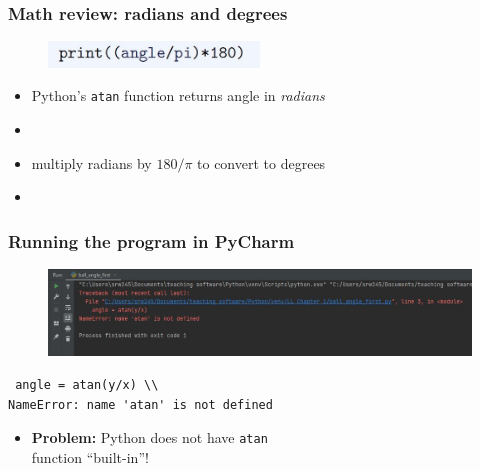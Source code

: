 \documentclass[14pt]{beamer}
\begin{document}

\begin{frame}[fragile]
\frametitle{Math review: radians and degrees}

\begin{figure}[ht]
	\centering
	\includegraphics[width=0.5\textwidth]{figures/LLp12b}
\end{figure}

\begin{itemize}
\item Python's \texttt{atan} function returns angle in \emph{radians}
\item[]
\item multiply radians by $180/\pi$ to convert to degrees
\item[]
\end{itemize}
\end{frame}


\begin{frame}[fragile]

\frametitle{Running the program in PyCharm}

\begin{figure}[ht]
	\centering
	\includegraphics[width=\textwidth]{figures/LLp12output}
\end{figure}

\begin{verbatim}
 angle = atan(y/x) \\
NameError: name 'atan' is not defined
\end{verbatim}

\begin{itemize}
\item \textbf{Problem:} Python does not have \texttt{atan} \\ \qquad\qquad\quad function ``built-in''!
\end{itemize}

\end{frame}
\end{document}
